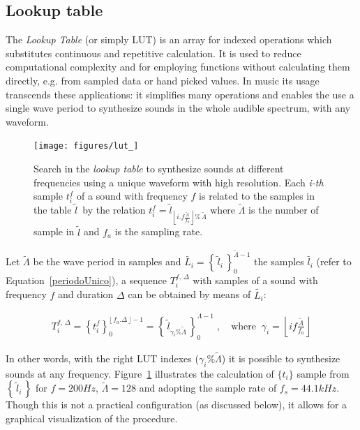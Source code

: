 \subsection{Lookup table}\label{subsec:lookup}
The \emph{Lookup Table} (or simply LUT) is an array for indexed operations which substitutes continuous and repetitive calculation. It is used to reduce computational complexity and for employing functions without calculating them directly, e.g. from sampled data or hand picked values.
In music its usage transcends these applications: it simplifies many operations and enables the use a single wave period to synthesize sounds in the whole audible spectrum, with any waveform.

\begin{figure}
    \centering
        \texttt{[image: figures/lut\_]}
    \caption{Search in the \emph{lookup table} to synthesize sounds at different frequencies using a unique waveform with high resolution.
	Each \emph{i-th} sample $t_i^f$ of a sound with frequency $f$ is related to the samples in the table $\widetilde{l}$\, by the relation $t_i^{f}=\widetilde{l}_{\left\lfloor i.f\frac{\widetilde{\Lambda}}{f_a} \right\rfloor \%\,\widetilde{\Lambda}}$ where $\widetilde{\Lambda}$ is the number of sample in $\widetilde{l}$ and $f_a$ is the sampling rate.}
        \label{fig:lut}
\end{figure}

Let $\widetilde{\Lambda}$ be the wave period in samples and $\widetilde{L_i} = \left\{\, \widetilde{l}_i \,\right\}_0^{\widetilde{\Lambda} -1}$ the samples $\widetilde{l_i}$ (refer to Equation~\ref{periodoUnico}), a sequence $T_i^{f,\,\Delta}$ with samples of a sound with frequency $f$ and duration $\Delta$ can be obtained by means of $\widetilde{L_i}$:

\begin{equation}\label{eq:lut}
\begin{split}
T_i^{f,\,\Delta}=\left\{t_i^f\right\}_0^{\lfloor \, f_a . \Delta \, \rfloor -1} = \left\{ \, \widetilde{l}_{\gamma_i \% \widetilde{\Lambda} }\, \right\}_{0}^{\Lambda-1}\; , \quad \text{where} \;\; \gamma_i = \left \lfloor i f \frac{ \widetilde{\Lambda}}{f_a} \right \rfloor  
\end{split}
\end{equation}

In other words, with the right LUT indexes ($\gamma_i\%\widetilde{\Lambda}$) it is possible to synthesize sounds at any frequency. Figure~\ref{fig:lut} illustrates the calculation of $\{t_i\}$ sample from $\left\{\,\widetilde{l}_i\,\right\}$ for $f=200Hz$, $\widetilde{\Lambda}=128$ and adopting the sample rate of $f_s=44.1kHz$. Though this is not a practical configuration (as discussed below), it allows for a graphical visualization of the procedure.

